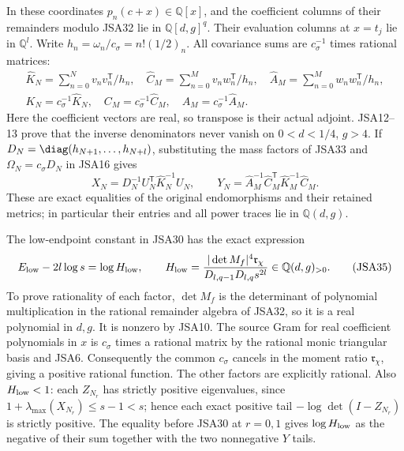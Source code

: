 In these coordinates $p_n(c+x)\in\mathbb Q[x]$, and the
coefficient columns of their remainders modulo JSA32 lie in
$\mathbb Q[d,g]^q$. Their evaluation columns at $x=t_j$ lie
in $\mathbb Q^l$. Write $h_n=\omega_n/c_\sigma=n!(1/2)_n$.
All covariance sums are $c_\sigma^{-1}$ times rational matrices:
\[
\begin{gathered}
 \widehat K_N=\sum_{n=0}^N v_nv_n^{\mathsf T}/h_n,
 \quad\widehat C_M=\sum_{n=0}^M v_nw_n^{\mathsf T}/h_n,
 \quad\widehat A_M=\sum_{n=0}^M w_nw_n^{\mathsf T}/h_n,\\
 K_N=c_\sigma^{-1}\widehat K_N,\quad
 C_M=c_\sigma^{-1}\widehat C_M,\quad
 A_M=c_\sigma^{-1}\widehat A_M.
\end{gathered}\tag{JSA33}
\]
Here the coefficient vectors are real, so transpose is their
actual adjoint. JSA12--13 prove that the inverse denominators
never vanish on $0<d<1/4$, $g>4$. If
$D_N=\diag(h_{N+1},\ldots,h_{N+l})$, substituting the mass
factors of JSA33 and $\Omega_N=c_\sigma D_N$ in JSA16 gives
\[
 X_N=D_N^{-1}U_N^{\mathsf T}\widehat K_N^{-1}U_N,\qquad
 Y_N=\widehat A_M^{-1}\widehat C_M^{\mathsf T}
                    \widehat K_M^{-1}\widehat C_M.
\tag{JSA34}
\]
These are exact equalities of the original endomorphisms and
their retained metrics; in particular their entries and all
power traces lie in $\mathbb Q(d,g)$.

The low-endpoint constant in JSA30 has the exact expression
\[
 E_{\rm low}-2l\log s=\log H_{\rm low},\qquad
 H_{\rm low}=
 \frac{|\det M_f|^4\mathfrak r_\chi}
      {D_{l,q-1}D_{l,q}s^{2l}}\in\mathbb Q(d,g)_{>0}.
\tag{JSA35}
\]
To prove rationality of each factor, $\det M_f$ is the
determinant of polynomial multiplication in the rational
remainder algebra of JSA32, so it is a real polynomial in
$d,g$. It is nonzero by JSA10. The source Gram for real
coefficient polynomials in $x$ is $c_\sigma$ times a rational
matrix by the rational monic triangular basis and JSA6.
Consequently the common $c_\sigma$ cancels in the moment ratio
$\mathfrak r_\chi$, giving a positive rational function.
The other factors are explicitly rational. Also $H_{\rm low}<1$:
each $Z_{N_r}$ has strictly positive eigenvalues, since
$1+\lambda_{\max}(X_{N_r})\leq s-1<s$; hence each exact
positive tail $-\log\det(I-Z_{N_r})$ is strictly positive.
The equality before JSA30 at $r=0,1$ gives
$\log H_{\rm low}$ as the negative of their sum together
with the two nonnegative $Y$ tails.

